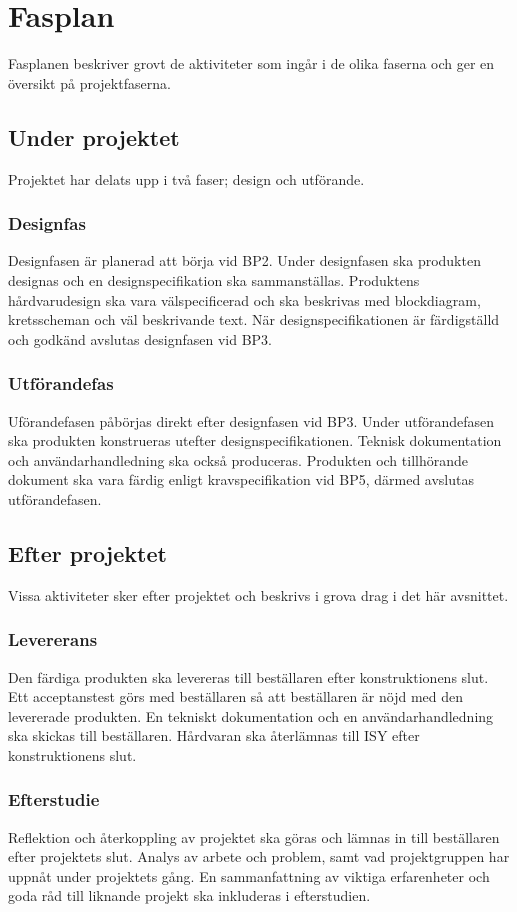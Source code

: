 \documentclass[projektplan/plan.tex]{subfiles}
\begin{document}
\section{Fasplan}
Fasplanen beskriver grovt de aktiviteter som ingår i de olika faserna och ger
en översikt på projektfaserna.

\subsection{Under projektet}
Projektet har delats upp i två faser; design och utförande.

\subsubsection*{Designfas}
Designfasen är planerad att börja vid BP2. Under designfasen ska produkten
designas och en designspecifikation ska sammanställas. Produktens
hårdvarudesign ska vara välspecificerad och ska beskrivas med blockdiagram,
kretsscheman och väl beskrivande text. När designspecifikationen är
färdigställd och godkänd avslutas designfasen vid BP3.

\subsubsection*{Utförandefas}
Uförandefasen påbörjas direkt efter designfasen vid BP3. Under utförandefasen
ska produkten konstrueras utefter designspecifikationen. Teknisk dokumentation
och användarhandledning ska också produceras. Produkten och tillhörande
dokument ska vara färdig enligt kravspecifikation vid BP5, därmed avslutas
utförandefasen.

\subsection{Efter projektet}
Vissa aktiviteter sker efter projektet och beskrivs i grova drag i det här
avsnittet.

\subsubsection*{Levererans}
Den färdiga produkten ska levereras till beställaren efter konstruktionens
slut. Ett acceptanstest görs med beställaren så att beställaren är nöjd med den
levererade produkten. En tekniskt dokumentation och en användarhandledning ska
skickas till beställaren. Hårdvaran ska återlämnas till ISY efter
konstruktionens slut.

\subsubsection*{Efterstudie}
Reflektion och återkoppling av projektet ska göras och lämnas in till
beställaren efter projektets slut. Analys av arbete och problem, samt vad
projektgruppen har uppnåt under projektets gång. En sammanfattning av viktiga
erfarenheter och goda råd till liknande projekt ska inkluderas i efterstudien.
\end{document}
